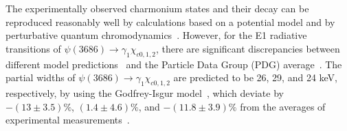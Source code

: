 \documentclass[prd,twocolumn,showpacs,amsmath,amssymb]{revtex4-1}
\begin{document}
The experimentally observed charmonium states and their decay can be reproduced reasonably well by calculations based on a potential model and by
perturbative quantum chromodynamics~\cite{QM}. However, for the E1 radiative transitions of
$\psi(3686)\rightarrow\gamma_{1}\chi_{c0,1,2}$, there are significant discrepancies between different model predictions~\cite{QM_1,QM_chi1,Theory_1}
and the Particle Data Group (PDG) average~\cite{PDG}. The partial widths of $\psi(3686)\rightarrow\gamma_{1}\chi_{c0,1,2}$ are predicted to be
26, 29, and 24 keV, respectively, by using the Godfrey-Isgur model~\cite{Theory_1}, which deviate by $-(13\pm3.5)\%$, $(1.4\pm4.6)\%$, and $-(11.8\pm3.9)\%$
from the averages of experimental measurements~\cite{PDG}.

\end{document}
